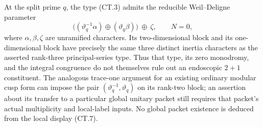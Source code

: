 \begin{remark}
At the split prime $q$, the type (CT.3) admits the reducible
Weil--Deligne parameter
\[
   \bigl((\vartheta_q^{-1}\alpha)\oplus
                (\vartheta_q\beta)\bigr)\ \oplus\ \zeta,
                   \qquad N=0,                          \tag{CT.7}
\]
where $\alpha,\beta,\zeta$ are unramified characters.
Its two-dimensional block and its one-dimensional block
have precisely the same three distinct inertia characters
as the asserted rank-three principal-series type.  Thus
that type, its zero monodromy, and the integral congruence
do not themselves rule out an endoscopic $2+1$ constituent.
The analogous trace-one argument for an existing ordinary
modular cusp form can impose the pair
$(\vartheta_q^{-1},\vartheta_q)$ on its rank-two block;
an assertion about its transfer to a particular global
unitary packet still requires that packet's actual
multiplicity and local-label inputs.  No global packet
existence is deduced from the local display (CT.7).
\end{remark}
